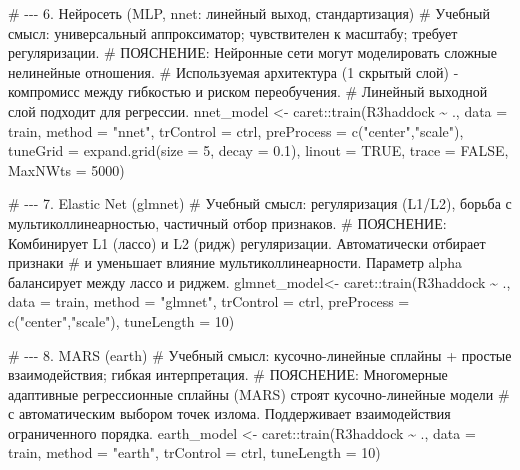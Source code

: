 \documentclass[
  letterpaper,
  DIV=11,
  numbers=noendperiod]{scrreprt}
\newenvironment{Shaded}{\begin{snugshade}}{\end{snugshade}}
\newcommand{\AttributeTok}[1]{\textcolor[rgb]{0.40,0.45,0.13}{#1}}
\newcommand{\CommentTok}[1]{\textcolor[rgb]{0.37,0.37,0.37}{#1}}
\newcommand{\ConstantTok}[1]{\textcolor[rgb]{0.56,0.35,0.01}{#1}}
\newcommand{\DecValTok}[1]{\textcolor[rgb]{0.68,0.00,0.00}{#1}}
\newcommand{\FloatTok}[1]{\textcolor[rgb]{0.68,0.00,0.00}{#1}}
\newcommand{\FunctionTok}[1]{\textcolor[rgb]{0.28,0.35,0.67}{#1}}
\newcommand{\NormalTok}[1]{\textcolor[rgb]{0.00,0.23,0.31}{#1}}
\newcommand{\OtherTok}[1]{\textcolor[rgb]{0.00,0.23,0.31}{#1}}
\newcommand{\SpecialCharTok}[1]{\textcolor[rgb]{0.37,0.37,0.37}{#1}}
\newcommand{\StringTok}[1]{\textcolor[rgb]{0.13,0.47,0.30}{#1}}
\begin{document}
\begin{Shaded}
\begin{Highlighting}[]
\CommentTok{\# {-}{-}{-} 6. Нейросеть (MLP, nnet: линейный выход, стандартизация)}
\CommentTok{\# Учебный смысл: универсальный аппроксиматор; чувствителен к масштабу; требует регуляризации.}
\CommentTok{\# ПОЯСНЕНИЕ: Нейронные сети могут моделировать сложные нелинейные отношения. }
\CommentTok{\# Используемая архитектура (1 скрытый слой) {-} компромисс между гибкостью и риском переобучения.}
\CommentTok{\# Линейный выходной слой подходит для регрессии.}
\NormalTok{nnet\_model  }\OtherTok{\textless{}{-}}\NormalTok{ caret}\SpecialCharTok{::}\FunctionTok{train}\NormalTok{(R3haddock }\SpecialCharTok{\textasciitilde{}}\NormalTok{ ., }\AttributeTok{data =}\NormalTok{ train, }\AttributeTok{method =} \StringTok{"nnet"}\NormalTok{,}
                            \AttributeTok{trControl =}\NormalTok{ ctrl, }\AttributeTok{preProcess =} \FunctionTok{c}\NormalTok{(}\StringTok{"center"}\NormalTok{,}\StringTok{"scale"}\NormalTok{),}
                            \AttributeTok{tuneGrid =} \FunctionTok{expand.grid}\NormalTok{(}\AttributeTok{size =} \DecValTok{5}\NormalTok{, }\AttributeTok{decay =} \FloatTok{0.1}\NormalTok{),}
                            \AttributeTok{linout =} \ConstantTok{TRUE}\NormalTok{, }\AttributeTok{trace =} \ConstantTok{FALSE}\NormalTok{, }\AttributeTok{MaxNWts =} \DecValTok{5000}\NormalTok{)}

\CommentTok{\# {-}{-}{-} 7. Elastic Net (glmnet)}
\CommentTok{\# Учебный смысл: регуляризация (L1/L2), борьба с мультиколлинеарностью, частичный отбор признаков.}
\CommentTok{\# ПОЯСНЕНИЕ: Комбинирует L1 (лассо) и L2 (ридж) регуляризации. Автоматически отбирает признаки }
\CommentTok{\# и уменьшает влияние мультиколлинеарности. Параметр alpha балансирует между лассо и риджем.}
\NormalTok{glmnet\_model}\OtherTok{\textless{}{-}}\NormalTok{ caret}\SpecialCharTok{::}\FunctionTok{train}\NormalTok{(R3haddock }\SpecialCharTok{\textasciitilde{}}\NormalTok{ ., }\AttributeTok{data =}\NormalTok{ train, }\AttributeTok{method =} \StringTok{"glmnet"}\NormalTok{,}
                            \AttributeTok{trControl =}\NormalTok{ ctrl, }\AttributeTok{preProcess =} \FunctionTok{c}\NormalTok{(}\StringTok{"center"}\NormalTok{,}\StringTok{"scale"}\NormalTok{), }\AttributeTok{tuneLength =} \DecValTok{10}\NormalTok{)}

\CommentTok{\# {-}{-}{-} 8. MARS (earth)}
\CommentTok{\# Учебный смысл: кусочно{-}линейные сплайны + простые взаимодействия; гибкая интерпретация.}
\CommentTok{\# ПОЯСНЕНИЕ: Многомерные адаптивные регрессионные сплайны (MARS) строят кусочно{-}линейные модели }
\CommentTok{\# с автоматическим выбором точек излома. Поддерживает взаимодействия ограниченного порядка.}
\NormalTok{earth\_model }\OtherTok{\textless{}{-}}\NormalTok{ caret}\SpecialCharTok{::}\FunctionTok{train}\NormalTok{(R3haddock }\SpecialCharTok{\textasciitilde{}}\NormalTok{ ., }\AttributeTok{data =}\NormalTok{ train, }\AttributeTok{method =} \StringTok{"earth"}\NormalTok{,}
                            \AttributeTok{trControl =}\NormalTok{ ctrl, }\AttributeTok{tuneLength =} \DecValTok{10}\NormalTok{)}


\end{Highlighting}
\end{Shaded}
\end{document}
